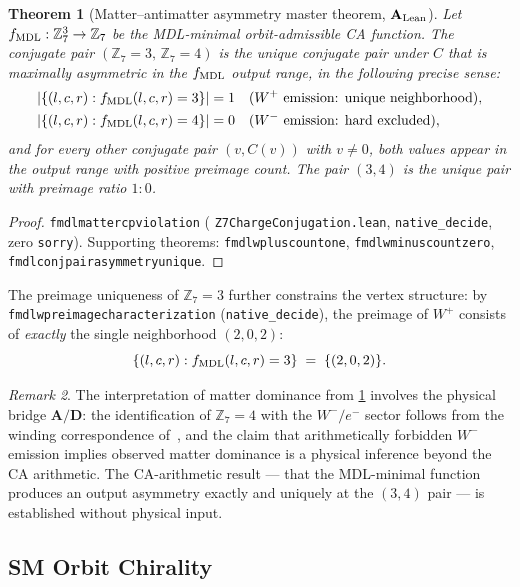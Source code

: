 \documentclass[11pt]{article}
\newtheorem{theorem}{Theorem}[section]
\theoremstyle{remark}
\newtheorem{remark}[theorem]{Remark}
\newcommand{\lean}[1]{%
  \penalty-100
  \begingroup\def\_{\textunderscore\allowbreak}\texttt{#1}\endgroup}
\newcommand{\CatAL}{\ensuremath{\textbf{A}_{\rm Lean}}}
\newcommand{\CatAD}{\textbf{A/D}}
\begin{document}
\begin{theorem}[Matter--antimatter asymmetry master theorem, $\CatAL$]\label{thm:cp_master}
Let $f_{\rm MDL}: \mathbb{Z}_7^3 \to \mathbb{Z}_7$ be the MDL-minimal orbit-admissible
CA function.
The conjugate pair $(\mathbb{Z}_7 = 3,\, \mathbb{Z}_7 = 4)$ is the \emph{unique} conjugate
pair under $C$ that is maximally asymmetric in the $f_{\rm MDL}$ output range, in the
following precise sense:
\begin{align*}
|\{(l,c,r): f_{\rm MDL}(l,c,r) = 3\}| &= 1 \quad (W^+\text{ emission: unique neighborhood}),\\
|\{(l,c,r): f_{\rm MDL}(l,c,r) = 4\}| &= 0 \quad (W^-\text{ emission: hard excluded}),
\end{align*}
and for every other conjugate pair $(v, C(v))$ with $v \neq 0$, both values appear in
the output range with positive preimage count.
The pair $(3,4)$ is the unique pair with preimage ratio $1:0$.
\end{theorem}

\begin{proof}
\lean{fmdl\_matter\_cp\_violation} (\lean{Z7ChargeConjugation.lean},
\texttt{native\_decide}, zero \texttt{sorry}).
Supporting theorems: \lean{fmdl\_w\_plus\_count\_one}, \lean{fmdl\_w\_minus\_count\_zero},
\lean{fmdl\_conj\_pair\_asymmetry\_unique}.
\end{proof}

The preimage uniqueness of $\mathbb{Z}_7 = 3$ further constrains the vertex structure:
by \lean{fmdl\_w\_preimage\_characterization} (\texttt{native\_decide}),
the preimage of $W^+$ consists of \emph{exactly} the single neighborhood $(2,0,2)$:
\[
\{(l,c,r) : f_{\rm MDL}(l,c,r) = 3\} \;=\; \{(2,0,2)\}.
\]

\begin{remark}
The interpretation of matter dominance from \cref{thm:cp_master} involves the physical
bridge $\CatAD$: the identification of $\mathbb{Z}_7 = 4$ with the $W^-/e^-$ sector follows
from the winding correspondence of~\cite{Spivack2026_SM_UGP}, and the claim that
arithmetically forbidden $W^-$ emission implies observed matter dominance is a
physical inference beyond the CA arithmetic.
The CA-arithmetic result --- that the MDL-minimal function produces an output asymmetry
exactly and uniquely at the $(3,4)$ pair --- is established without physical input.
\end{remark}

\subsection{SM Orbit Chirality}
\label{sec:chirality}
\end{document}
